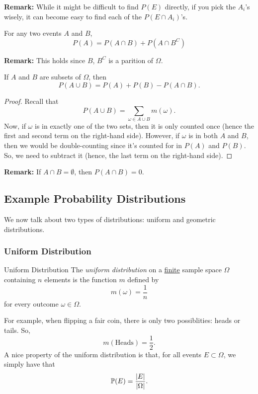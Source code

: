 \textbf{Remark:} While it might be difficult to find $P(E)$ directly, if you pick the $A_i$'s wisely, it can become easy to find each of the $P(E \cap A_i)$'s.

\begin{corollary}{}{}
    For any two events $A$ and $B$,
    \[P(A) = P(A \cap B) + P(A \cap B^C)\]
\end{corollary}
\textbf{Remark:} This holds since $B$, $B^C$ is a parition of $\Omega$. 

\begin{theorem}
    If $A$ and $B$ are subsets of $\Omega$, then 
    \[P(A \cup B) = P(A) + P(B) - P(A \cap B).\]
\end{theorem}
\begin{mdframed}[]
    \begin{proof}
        Recall that
        \[P(A \cup B) = \sum_{\omega \in A \cup B} m(\omega).\]
        Now, if $\omega$ is in exactly one of the two sets, then it is only counted once (hence the first and second term on the right-hand side). However, if $\omega$ is in both $A$ and $B$, then we would be double-counting since it's counted for in $P(A)$ and $P(B)$. So, we need to subtract it (hence, the last term on the right-hand side). 
    \end{proof}
\end{mdframed}
\textbf{Remark:} If $A \cap B = \emptyset$, then $P(A \cap B) = 0$.


\subsection{Example Probability Distributions}
We now talk about two types of distributions: uniform and geometric distributions.

\subsubsection{Uniform Distribution}
\begin{definition}{Uniform Distribution}{}
    The \emph{uniform distribution} on a \underline{finite} sample space $\Omega$ containing $n$ elements is the function $m$ defined by 
    \[m(\omega) = \frac{1}{n}\]
    for every outcome $\omega \in \Omega$. 
\end{definition}
For example, when flipping a fair coin, there is only two possiblities: heads or tails. So,
\[m(\text{Heads}) = \frac{1}{2}.\]
A nice property of the uniform distribution is that, for all events $E \subset \Omega$, we simply have that 
\[\mathbb{P}(E) = \frac{|E|}{|\Omega|}.\]

